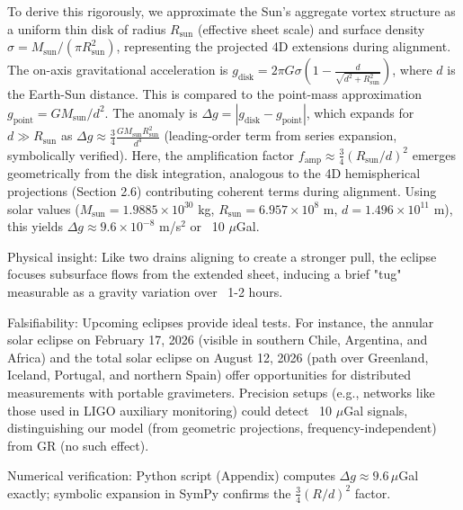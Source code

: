 To derive this rigorously, we approximate the Sun's aggregate vortex structure as a uniform thin disk of radius $R_\text{sun}$ (effective sheet scale) and surface density $\sigma = M_\text{sun} / (\pi R_\text{sun}^2)$, representing the projected 4D extensions during alignment. The on-axis gravitational acceleration is $g_{\text{disk}} = 2 \pi G \sigma \left(1 - \frac{d}{\sqrt{d^2 + R_\text{sun}^2}}\right)$, where $d$ is the Earth-Sun distance. This is compared to the point-mass approximation $g_{\text{point}} = G M_\text{sun} / d^2$. The anomaly is $\Delta g = |g_{\text{disk}} - g_{\text{point}}|$, which expands for $d \gg R_\text{sun}$ as $\Delta g \approx \frac{3}{4} \frac{G M_\text{sun} R_\text{sun}^2}{d^4}$ (leading-order term from series expansion, symbolically verified). Here, the amplification factor $f_{\text{amp}} \approx \frac{3}{4} (R_\text{sun}/d)^2$ emerges geometrically from the disk integration, analogous to the 4D hemispherical projections (Section 2.6) contributing coherent terms during alignment. Using solar values ($M_\text{sun} = 1.9885 \times 10^{30}$ kg, $R_\text{sun} = 6.957 \times 10^8$ m, $d = 1.496 \times 10^{11}$ m), this yields $\Delta g \approx 9.6 \times 10^{-8}$ m/s$^2$ or ~10 $\mu$Gal.

Physical insight: Like two drains aligning to create a stronger pull, the eclipse focuses subsurface flows from the extended sheet, inducing a brief "tug" measurable as a gravity variation over ~1-2 hours.

Falsifiability: Upcoming eclipses provide ideal tests. For instance, the annular solar eclipse on February 17, 2026 (visible in southern Chile, Argentina, and Africa) and the total solar eclipse on August 12, 2026 (path over Greenland, Iceland, Portugal, and northern Spain) offer opportunities for distributed measurements with portable gravimeters. Precision setups (e.g., networks like those used in LIGO auxiliary monitoring) could detect ~10 $\mu$Gal signals, distinguishing our model (from geometric projections, frequency-independent) from GR (no such effect).

Numerical verification: Python script (Appendix) computes $\Delta g \approx 9.6 \, \mu$Gal exactly; symbolic expansion in SymPy confirms the $\frac{3}{4} (R/d)^2$ factor.

\medskip
\noindent
{}
\medskip




